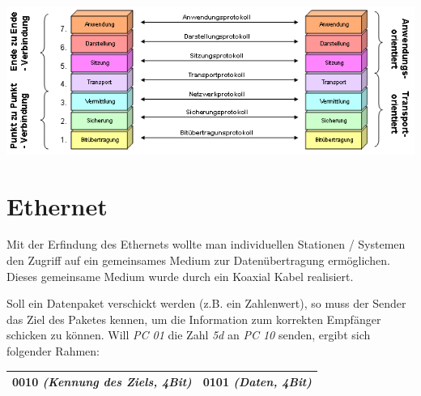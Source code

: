 \documentclass[12pt,a4paper]{article}
\begin{document}
    \includegraphics[scale=.75]{Bilder/OSI-Modell2}

\section{Ethernet}
    Mit der Erfindung des Ethernets wollte man individuellen Stationen / Systemen den Zugriff auf ein gemeinsames Medium zur Datenübertragung ermöglichen. Dieses gemeinsame Medium wurde durch ein Koaxial Kabel realisiert.
	\begin{figure}[h]
        \centering
	\end{figure}\newline
    Soll ein Datenpaket verschickt werden (z.B. ein Zahlenwert), so muss der Sender das Ziel des Paketes kennen, um die Information zum korrekten Empfänger schicken zu können. \newline
    Will \textit{PC 01} die Zahl \textit{5d} an \textit{PC 10} senden, ergibt sich folgender Rahmen:
	\begin{center}
		\begin{tabularx}{14cm}{|X|X|}
			\hline
			0010 \textit{(Kennung des Ziels, 4Bit)}&0101 \textit{(Daten, 4Bit)}\\
			\hline
		\end{tabularx}
	\end{center}
\end{document}
